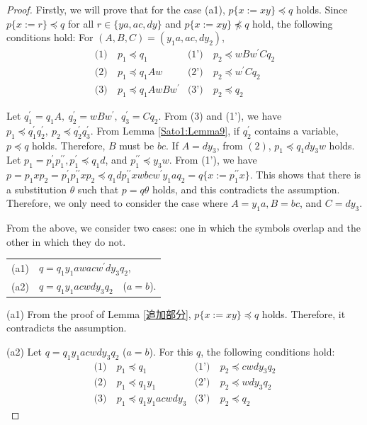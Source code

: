 \begin{proof}
Firstly, we will prove that for the case (a1), $p \{ x := xy \} \preceq q$ holds.
Since $p \{ x := r \} \preceq q$ for all $r \in \{ ya, ac, dy \}$ and $p \{ x := xy \} \not \preceq q$ hold, the following conditions hold:
For $(A,B,C) = (y_{1}a, ac, dy_{2})$,
\begin{align*}
  \textrm{(1)}~& p_{1} \preceq q_{1} & \textrm{(1')}~& p_{2} \preceq wBw^{\prime}Cq_{2} \\
  \textrm{(2)}~& p_{1} \preceq q_{1}Aw & \textrm{(2')}~& p_{2} \preceq w^{\prime}Cq_{2} \\
  \textrm{(3)}~& p_{1} \preceq q_{1}AwBw^{\prime} & \textrm{(3')}~& p_{2} \preceq q_{2}
\end{align*}

Let $q^{\prime}_{1}=q_{1}A,~q^{\prime}_{2}=wBw^{\prime},~q^{\prime}_{3}=Cq_{2}$.
From (3) and (1'), we have $p_{1} \preceq q^{\prime}_{1}q^{\prime}_{2},~p_{2} \preceq q^{\prime}_{2}q^{\prime}_{3}$.
From Lemma \ref{Sato1:Lemma9}, if $q^{\prime}_{2}$ contains a variable, $p \preceq q$ holds.
Therefore, $B$ must be $bc$.
If $A=dy_{3}$, from $(2)$, $p_{1} \preceq q_{1}dy_{3}w$ holds.
Let $p_{1}=p^{\prime}_{1}p^{\prime\prime}_{1}, p^{\prime}_{1} \preceq q_{1}d$, and $p^{\prime\prime}_{1} \preceq y_{3}w$.
From (1'), we have $p=p_{1}xp_{2}=p^{\prime}_{1}p^{\prime\prime}_{1}xp_{2} \preceq q_{1}dp^{\prime\prime}_{1}xwbcw^{\prime}y_{1}aq_{2}=q \{ x:=p^{\prime\prime}_{1}x \}$. This shows that there is a substitution $\theta$ such that $p=q\theta$ holds, and this contradicts the assumption. Therefore, we only need to consider the case where $A=y_{1}a,B=bc$, and $C=dy_{3}$.

From the above, we consider two cases: one in which the symbols overlap and the other in which they do not.
\smallskip

\begin{tabular}{cl}
\textrm{(a1)} & $q=q_{1}y_{1}awacw^{\prime}dy_{3}q_{2}$,\\
\textrm{(a2)} & $q=q_{1}y_{1}acwdy_{3}q_{2}$~~($a=b$).
\end{tabular}
\smallskip

\textrm{(a1)}
From the proof of Lemma \ref{追加部分}, $p \{ x:= xy \} \preceq q$ holds.
Therefore, it contradicts the assumption.

\textrm{(a2)}
Let $q=q_{1}y_{1}acwdy_{3}q_{2}$ ($a=b$).
For this $q$, the following conditions hold:
\begin{align*}
  \textrm{(1)}~& p_{1} \preceq q_{1} & \textrm{(1')}~& p_{2} \preceq cwdy_{3}q_{2} \\
  \textrm{(2)}~& p_{1} \preceq q_{1}y_{1} & \textrm{(2')}~& p_{2} \preceq wdy_{3}q_{2} \\
  \textrm{(3)}~& p_{1} \preceq q_{1}y_{1}acwdy_{3} & \textrm{(3')}~& p_{2} \preceq q_{2}
\end{align*}


\end{proof}
